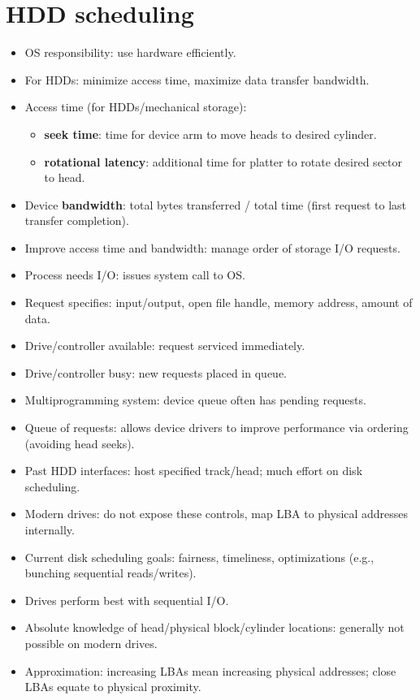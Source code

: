 \section{HDD scheduling}

\begin{itemize}
    \item OS responsibility: use hardware efficiently.
    \item For HDDs: minimize access time, maximize data transfer bandwidth.
    \item Access time (for HDDs/mechanical storage):
    \begin{itemize}
        \item \textbf{seek time}: time for device arm to move heads to desired cylinder.
        \item \textbf{rotational latency}: additional time for platter to rotate desired sector to head.
    \end{itemize}
    \item Device \textbf{bandwidth}: total bytes transferred / total time (first request to last transfer completion).
    \item Improve access time and bandwidth: manage order of storage I/O requests.
    \item Process needs I/O: issues system call to OS.
    \item Request specifies: input/output, open file handle, memory address, amount of data.
    \item Drive/controller available: request serviced immediately.
    \item Drive/controller busy: new requests placed in queue.
    \item Multiprogramming system: device queue often has pending requests.
    \item Queue of requests: allows device drivers to improve performance via ordering (avoiding head seeks).
    \item Past HDD interfaces: host specified track/head; much effort on disk scheduling.
    \item Modern drives: do not expose these controls, map LBA to physical addresses internally.
    \item Current disk scheduling goals: fairness, timeliness, optimizations (e.g., bunching sequential reads/writes).
    \item Drives perform best with sequential I/O.
    \item Absolute knowledge of head/physical block/cylinder locations: generally not possible on modern drives.
    \item Approximation: increasing LBAs mean increasing physical addresses; close LBAs equate to physical proximity.
\end{itemize}

